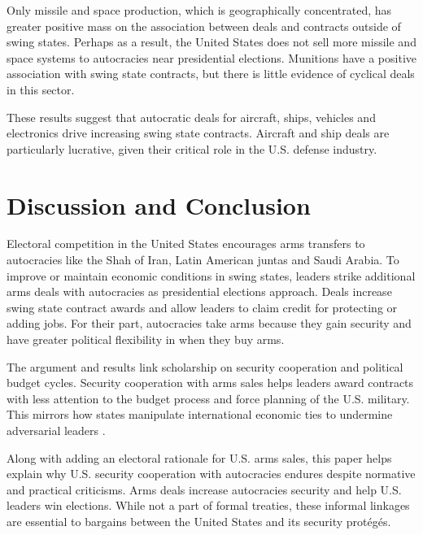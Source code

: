 \documentclass[12pt]{article}
\begin{document}
Only missile and space production, which is geographically concentrated, has greater positive mass on the association between deals and contracts outside of swing states. 
Perhaps as a result, the United States does not sell more missile and space systems to autocracies near presidential elections. 
Munitions have a positive association with swing state contracts, but there is little evidence of cyclical deals in this sector. 


These results suggest that autocratic deals for aircraft, ships, vehicles and electronics drive increasing swing state contracts.
Aircraft and ship deals are particularly lucrative, given their critical role in the U.S. defense industry. 



\section{Discussion and Conclusion}


Electoral competition in the United States encourages arms transfers to autocracies like the Shah of Iran, Latin American juntas and Saudi Arabia.
To improve or maintain economic conditions in swing states, leaders strike additional arms deals with autocracies as presidential elections approach.
Deals increase swing state contract awards and allow leaders to claim credit for protecting or adding jobs.
For their part, autocracies take arms because they gain security and have greater political flexibility in when they buy arms. 


The argument and results link scholarship on security cooperation and political budget cycles. 
Security cooperation with arms sales helps leaders award contracts with less attention to the budget process and force planning of the U.S. military.
This mirrors how states manipulate international economic ties to undermine adversarial leaders \citep{ChyzhUrbatsch2021, KimMargalit2021}.


Along with adding an electoral rationale for U.S. arms sales, this paper helps explain why U.S. security cooperation with autocracies endures despite normative and practical criticisms. 
Arms deals increase autocracies security and help U.S. leaders win elections.
While not a part of formal treaties, these informal linkages are essential to bargains between the United States and its security prot{\'e}g{\'e}s.
\end{document}
